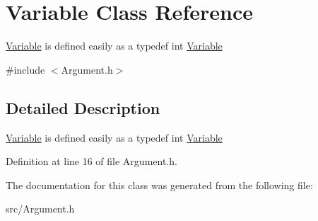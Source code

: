 \hypertarget{classVariable}{\section{Variable Class Reference}
\label{classVariable}
}


{\ttfamily \hyperlink{classVariable}{Variable}} is defined easily as a {\ttfamily typedef int \hyperlink{classVariable}{Variable}}  




{\ttfamily \#include $<$Argument.\-h$>$}



\subsection{Detailed Description}
{\ttfamily \hyperlink{classVariable}{Variable}} is defined easily as a {\ttfamily typedef int \hyperlink{classVariable}{Variable}} 

Definition at line 16 of file Argument.\-h.



The documentation for this class was generated from the following file\-:\begin{DoxyCompactItemize}
\item 
src/Argument.\-h\end{DoxyCompactItemize}
